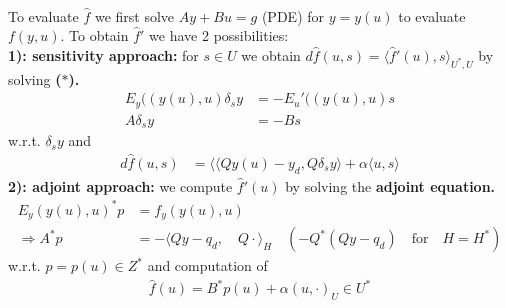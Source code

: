 \begin{example}
\begin{align*}
\end{align*}
To evaluate $\hat{f}$ we first solve $Ay + Bu = g$ (PDE) for $y = y(u)$ to evaluate $f(y, u)$. To obtain $\hat{f}'$ we have 2 possibilities:\\
\textbf{1): sensitivity approach: } for $s \in U$ we obtain $d \hat{f}(u, s) = \langle \hat{f}'(u), s \rangle_{U^*, U}$ by solving \textbf{($*$).}
\begin{align*}
	E_y ((y(u), u) \delta_s y &= - E_u'((y(u), u) s \\
	A\delta_{s}y &= - B s
\end{align*}
w.r.t. $\delta_{s}y$ and 
\begin{align*}
	d\hat{f}(u, s) &= \langle \langle Qy(u) - y_d, Q \delta_s y   \rangle + \alpha \langle u, s\rangle 
\end{align*}
\textbf{2): adjoint approach:}  we compute $\hat{f}'(u)$ by solving the \textbf{adjoint equation.}
\begin{align*}
	E_y(y(u), u)^* p  &= f_y(y(u), u) \\
	\Rightarrow 
	A^* p &= - \langle Qy - q_d, \quad Q \cdot\rangle_H \quad( - Q^*(Qy - q_d) \quad \text{for} \quad H = H^*)
\end{align*}
w.r.t. $p = p(u) \in Z^*$ and computation of 
\begin{align*}
	\hat{f}(u) = B^* p(u) + \alpha (u,  \cdot )_U  \in U^*
\end{align*}
\end{example}

